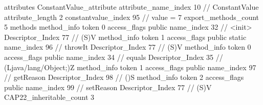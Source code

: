 {{{{{				attributes {
				ConstantValue_attribute {
					attribute_name_index	10		// ConstantValue
					attribute_length	2
					constantvalue_index	95		// value = 7
				}
				}
			}
			}
			export_methods_count	5
			methods {
				method_info {
					token	0
					access_flags	public
					name_index	32		// <init>
					Descriptor_Index	77		// (S)V
				}
				method_info {
					token	1
					access_flags	public static
					name_index	96		// throwIt
					Descriptor_Index	77		// (S)V
				}
				method_info {
					token	0
					access_flags	public
					name_index	34		// equals
					Descriptor_Index	35		// (Ljava/lang/Object;)Z
				}
				method_info {
					token	1
					access_flags	public
					name_index	97		// getReason
					Descriptor_Index	98		// ()S
				}
				method_info {
					token	2
					access_flags	public
					name_index	99		// setReason
					Descriptor_Index	77		// (S)V
				}
			}
			CAP22_inheritable_count	3
		}
	}
}
